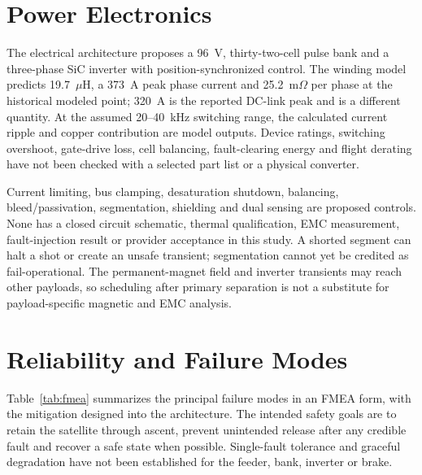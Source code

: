 \documentclass[conference]{IEEEtran}
\begin{document}
\section{Power Electronics}\label{sec:pe}
The electrical architecture proposes a 96~V, thirty-two-cell pulse bank and a three-phase SiC inverter with position-synchronized control. The winding model predicts 19.7~$\mu$H, a 373~A peak phase current and 25.2~m$\Omega$ per phase at the historical modeled point; 320~A is the reported DC-link peak and is a different quantity. At the assumed 20--40~kHz switching range, the calculated current ripple and copper contribution are model outputs. Device ratings, switching overshoot, gate-drive loss, cell balancing, fault-clearing energy and flight derating have not been checked with a selected part list or a physical converter.

Current limiting, bus clamping, desaturation shutdown, balancing, bleed/passivation, segmentation, shielding and dual sensing are proposed controls. None has a closed circuit schematic, thermal qualification, EMC measurement, fault-injection result or provider acceptance in this study. A shorted segment can halt a shot or create an unsafe transient; segmentation cannot yet be credited as fail-operational. The permanent-magnet field and inverter transients may reach other payloads, so scheduling after primary separation is not a substitute for payload-specific magnetic and EMC analysis.

\section{Reliability and Failure Modes}\label{sec:fmea}
Table~\ref{tab:fmea} summarizes the principal failure modes in an FMEA form, with the mitigation designed into the architecture. The intended safety goals are to retain the satellite through ascent, prevent unintended release after any credible fault and recover a safe state when possible. Single-fault tolerance and graceful degradation have not been established for the feeder, bank, inverter or brake.
\end{document}
